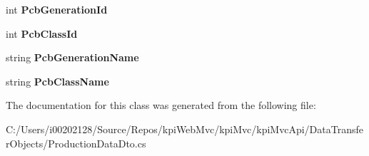 \begin{DoxyCompactItemize}
int {\bfseries Pcb\+Generation\+Id}
\item 
\mbox{\label{classkpi_mvc_api_1_1_data_transfer_objects_1_1_production_data_dto_a3457356b5964b52fe3acab23d767af64}} 
int {\bfseries Pcb\+Class\+Id}
\item 
\mbox{\label{classkpi_mvc_api_1_1_data_transfer_objects_1_1_production_data_dto_a37f53ff630db6d89e4eff71f47fb49c3}} 
string {\bfseries Pcb\+Generation\+Name}
\item 
\mbox{\label{classkpi_mvc_api_1_1_data_transfer_objects_1_1_production_data_dto_aa5a9bc917649d9c099eb28f3a067ce26}} 
string {\bfseries Pcb\+Class\+Name}
\end{DoxyCompactItemize}


The documentation for this class was generated from the following file\+:\begin{DoxyCompactItemize}
\item 
C\+:/\+Users/i00202128/\+Source/\+Repos/kpi\+Web\+Mvc/kpi\+Mvc/kpi\+Mvc\+Api/\+Data\+Transfer\+Objects/Production\+Data\+Dto.\+cs\end{DoxyCompactItemize}
